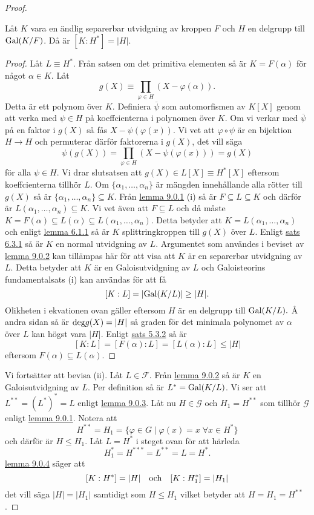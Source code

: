 \documentclass{article}
\newcommand{\grad}[0]{\textnormal{deg}}
\newcommand{\gal}[0]{\textnormal{Gal}}
\theoremstyle{definition}
\begin{document}
\begin{proof}
  \hypertarget{lemma9.0.4}{}
  \begin{mylemma}{}{}
    Låt $K$ vara en ändlig separerbar utvidgning av kroppen $F$ och $H$ en delgrupp till $\gal(K/F)$. Då är $[K:H^*] = |H|.$
  \end{mylemma}
  
  \begin{proof}
    Låt $L \equiv H^*$. Från satsen om det primitiva elementen så är $K = F(\alpha)$ för något $\alpha \in K$. Låt 
    \[g(X) \equiv \prod_{\varphi \in H} (X - \varphi(\alpha)).  \]
    Detta är ett polynom över $K$. Definiera $\overline{\psi}$ som automorfismen av $K[X]$ genom att verka med $\psi \in H$ på koeffcienterna i polynomen över $K$.
    Om vi verkar med $\overline{\psi}$ på en faktor i $g(X)$ så fås $X - \psi(\varphi(x))$. Vi vet att $\varphi \circ \psi$ är en bijektion $H \rightarrow H$ 
    och permuterar därför faktorerna i $g(X)$, det vill säga 
    \[\psi(g(X)) = \prod_{\varphi \in H} (X - \psi(\varphi(x))) = g(X)  \]
    för alla $\psi \in H$. Vi drar slutsatsen att $g(X) \in L[X] \equiv H^*[X]$ eftersom koeffcienterna tillhör $L$. Om 
    $\{\alpha_1, \ldots, \alpha_n\}$ är mängden innehållande alla rötter till $g(X)$ så är $\{\alpha_1, \ldots, \alpha_n\} \subseteq K.$ 
    Från \hyperlink{lemma9.0.1}{lemma 9.0.1} (i) så är $F \subseteq L \subseteq K$ och därför är $L(\alpha_1, \ldots, \alpha_n) \subseteq K$.
    Vi vet även att $F \subseteq L$ och då måste $K = F(\alpha) \subseteq L(\alpha) \subseteq L(\alpha_1, \ldots, \alpha_n)$. Detta betyder att 
    $K = L(\alpha_1, \ldots, \alpha_n)$ och enligt \hyperlink{lemma6.0.1}{lemma 6.1.1} så är $K$ splittringkroppen till $g(X)$ över $L$.
    Enligt \hyperlink{sats6.3.1}{sats 6.3.1} så är $K$ en normal utvidgning av $L$. Argumentet som användes i beviset av \hyperlink{lemma9.0.2}{lemma 9.0.2}
    kan tillämpas här för att visa att $K$ är en separerbar utvidgning av $L$. Detta betyder att $K$ är en Galoisutvidgning av $L$
    och Galoisteorins fundamentalsats (i) kan användas för att få 
    \[ [K:L] = |\gal(K/L)| \geq |H|.\]
    Olikheten i ekvationen ovan gäller eftersom $H$ är en delgrupp till $\gal(K/L).$ Å andra sidan så är $\grad g(X) = |H|$ så graden för det minimala 
    polynomet av $\alpha$ över $L$ kan högst vara $|H|$. Enligt \hyperlink{5.3.2}{sats 5.3.2} så är 
    \[ [K:L] = [F(\alpha):L] = [L(\alpha):L] \leq |H| \]
    eftersom $F(\alpha) \subseteq L(\alpha)$.
  \end{proof}
  Vi fortsätter att bevisa (ii). Låt $L \in \mathcal{F}$. Från \hyperlink{lemma9.0.2}{lemma 9.0.2} så är $K$ en Galoisutvidgning av $L$. 
  Per definition så är $L^* = \gal(K/L)$. Vi ser att $L^{**} = (L^*)^* = L$ enligt \hyperlink{lemma9.0.3}{lemma 9.0.3}. 
  Låt nu $H \in \mathcal{G}$ och $H_1 = H^{**}$ som tillhör $\mathcal{G}$ enligt \hyperlink{lemma9.0.1}{lemma 9.0.1}. Notera att 
  \[ H^{**} = H_1 = \{\varphi \in G \; | \; \varphi(x) = x \; \forall x \in H^*\} \]
  och därför är $H \leq H_1.$ Låt $L = H^*$ i steget ovan för att härleda
  \[H_1^* = H^{***} = L^{**} = L = H^*.\]
  \hyperlink{lemma9.0.4}{lemma 9.0.4} säger att 
  \[ [K:H^*] = |H| \quad \textnormal{och} \quad [K:H_1^*] = |H_1| \]
  det vill säga $|H| = |H_1|$ samtidigt som $H \leq H_1$ vilket betyder att $H = H_1 = H^{**}$.


\end{proof}
\end{document}
